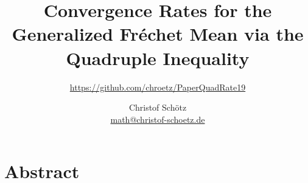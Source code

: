 \documentclass{scrartcl}
\begin{document}
%
%
%
\title{Convergence Rates for the Generalized Fréchet Mean via the Quadruple Inequality}
\subtitle{\url{https://github.com/chroetz/PaperQuadRate19}}
\author{Christof Schötz\\\href{mailto:math@christof-schoetz.de}{math@christof-schoetz.de}}
\date{}
%
\maketitle
%
\section*{Abstract}

%
\tableofcontents
%





%

\begin{appendices}

\end{appendices}
%
{}
\printindex[inot]
{}
\printindex[iass]
%
{}
\printbibliography
%
%
%
\end{document}
